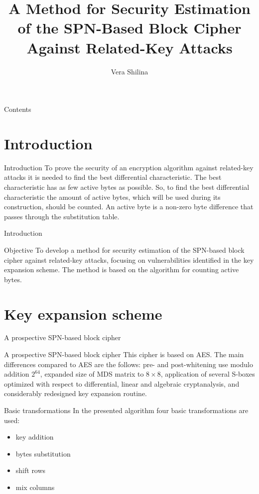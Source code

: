 \documentclass[10pt]{beamer}
\title{A Method for Security Estimation of the SPN-Based Block Cipher Against Related-Key Attacks}
\author{Vera Shilina}
\institute{Samara University}
\date{}
\begin{document}
\begin{frame}
\titlepage
\end{frame}

\begin{frame}{Contents}
\tableofcontents
\end{frame}

\section{Introduction}

\begin{frame}{Introduction}
To prove the security of an encryption algorithm against related-key attacks it is needed to find the \alert{best differential characteristic}. The best characteristic has as few active bytes as possible. So, to find the \alert{best differential characteristic} the amount of active bytes, which will be used during its construction, should be counted. An active byte is a non-zero byte difference that passes through the substitution table.
\end{frame}

\begin{frame}{Introduction}
\begin{alertblock}{Objective}
To develop a method for security estimation of the SPN-based block cipher against related-key attacks, focusing on vulnerabilities identified in the key expansion scheme. The method is based on the algorithm for counting active bytes.
\end{alertblock}
\end{frame}

\section{Key expansion scheme}

\begin{frame}{A prospective SPN-based block cipher}
\begin{block}{A prospective SPN-based block cipher}
This cipher is based on AES. The main differences compared to AES are the follows: pre- and post-whitening use modulo addition $2^{64}$, expanded size of MDS matrix to $8 \times 8$, application of several S-boxes optimized with respect to differential, linear and algebraic cryptanalysis, and considerably redesigned key expansion routine.
\end{block}
\end{frame}

\begin{frame}{Basic transformations}
In the presented algorithm four basic transformations are used:
\begin{itemize}
    \item<1-> key addition
    \item<2-> bytes substitution
    \item<3-> shift rows
    \item<4-> mix columns
\end{itemize}
\end{frame}
\end{document}
